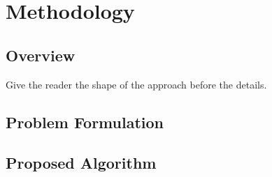 \section{Methodology}
\label{sec:methodology}

\subsection{Overview}
\label{subsec:overview}

%
%
Give the reader the shape of the approach before the details.

\subsection{Problem Formulation}
\label{subsec:formulation}


\subsection{Proposed Algorithm}
\label{subsec:algorithm}

